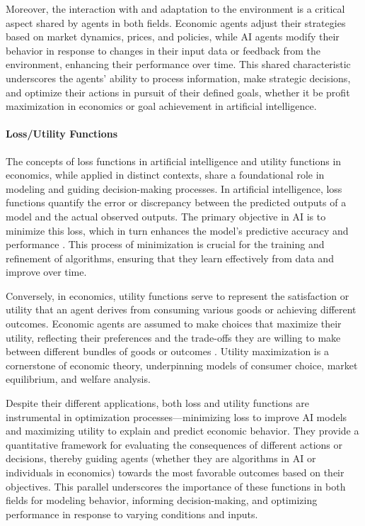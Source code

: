 \documentclass{article}
\begin{document}
Moreover, the interaction with and adaptation to the environment is a critical aspect shared by agents in both fields. Economic agents adjust their strategies based on market dynamics, prices, and policies, while AI agents modify their behavior in response to changes in their input data or feedback from the environment, enhancing their performance over time. This shared characteristic underscores the agents' ability to process information, make strategic decisions, and optimize their actions in pursuit of their defined goals, whether it be profit maximization in economics or goal achievement in artificial intelligence.

\paragraph{Loss/Utility Functions}
The concepts of loss functions in artificial intelligence and utility functions in economics, while applied in distinct contexts, share a foundational role in modeling and guiding decision-making processes. In artificial intelligence, loss functions quantify the error or discrepancy between the predicted outputs of a model and the actual observed outputs. The primary objective in AI is to minimize this loss, which in turn enhances the model's predictive accuracy and performance \cite{goodfellow_deep_2016}. This process of minimization is crucial for the training and refinement of algorithms, ensuring that they learn effectively from data and improve over time.

Conversely, in economics, utility functions serve to represent the satisfaction or utility that an agent derives from consuming various goods or achieving different outcomes. Economic agents are assumed to make choices that maximize their utility, reflecting their preferences and the trade-offs they are willing to make between different bundles of goods or outcomes \cite{varian_microeconomic_2014}. Utility maximization is a cornerstone of economic theory, underpinning models of consumer choice, market equilibrium, and welfare analysis.

Despite their different applications, both loss and utility functions are instrumental in optimization processes—minimizing loss to improve AI models and maximizing utility to explain and predict economic behavior. They provide a quantitative framework for evaluating the consequences of different actions or decisions, thereby guiding agents (whether they are algorithms in AI or individuals in economics) towards the most favorable outcomes based on their objectives. This parallel underscores the importance of these functions in both fields for modeling behavior, informing decision-making, and optimizing performance in response to varying conditions and inputs.
\end{document}
